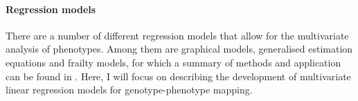 
\paragraph{Regression models} There are a number of different regression models that allow for the multivariate analysis of phenotypes. Among them are graphical models, generalised estimation equations and frailty models, for which a summary of methods and application can be found in \citep{Shriner2012,Yang2012}. Here, I will focus on describing the development of multivariate linear regression models for genotype-phenotype mapping. 

